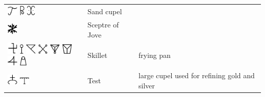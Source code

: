 \documentclass[british,final,landscape]{scrartcl}
\begin{document}
\begin{refsection}
\begin{supertabular}{p{0.3\textwidth}p{0.34\textwidth}p{0.34\textwidth}}
   \includegraphics[width=5mm]{Tools/SandCupel} \includegraphics[height=5mm]{Tools/SandCupel2} \includegraphics[height=5mm]{Tools/SandCupel3} & Sand cupel & \\
   \includegraphics[width=5mm]{Tools/SceptreOfJove} & Sceptre of Jove & \\
   \includegraphics[width=5mm]{Tools/Skillet}  \includegraphics[height=5mm]{Tools/Skillet2} \includegraphics[width=5mm]{Tools/Skillet3} \includegraphics[width=5mm]{Tools/Skillet4} \includegraphics[width=5mm]{Tools/Skillet5} \includegraphics[width=5mm]{Tools/Skillet6} \includegraphics[width=5mm]{Tools/Skillet7} \includegraphics[height=5mm]{Tools/Skillet8} & Skillet & frying pan \\
   \includegraphics[width=5mm]{Tools/Test} \includegraphics[width=5mm]{Tools/Test2} & Test & large cupel used for refining gold and silver \\

\end{supertabular}
\end{refsection}
\end{document}
